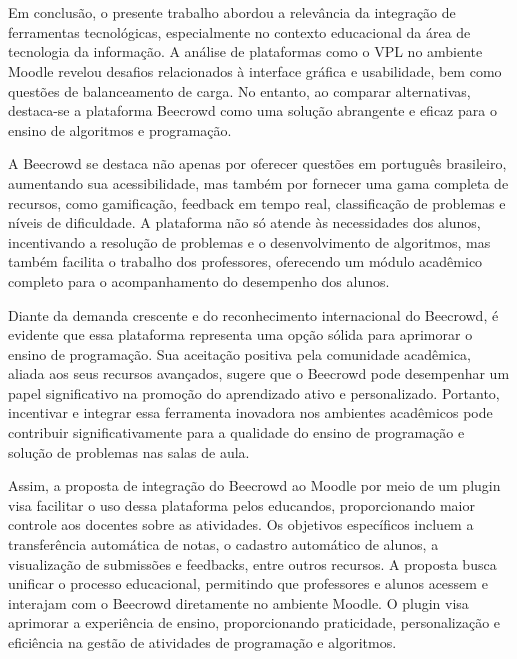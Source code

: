 

\chapter{}

Em conclusão, o presente trabalho abordou a relevância da integração de ferramentas tecnológicas, especialmente no contexto educacional da área de tecnologia da informação. A análise de plataformas como o VPL no ambiente Moodle revelou desafios relacionados à interface gráfica e usabilidade, bem como questões de balanceamento de carga. No entanto, ao comparar alternativas, destaca-se a plataforma Beecrowd como uma solução abrangente e eficaz para o ensino de algoritmos e programação.

A Beecrowd se destaca não apenas por oferecer questões em português brasileiro, aumentando sua acessibilidade, mas também por fornecer uma gama completa de recursos, como gamificação, feedback em tempo real, classificação de problemas e níveis de dificuldade. A plataforma não só atende às necessidades dos alunos, incentivando a resolução de problemas e o desenvolvimento de algoritmos, mas também facilita o trabalho dos professores, oferecendo um módulo acadêmico completo para o acompanhamento do desempenho dos alunos.

Diante da demanda crescente e do reconhecimento internacional do Beecrowd, é evidente que essa plataforma representa uma opção sólida para aprimorar o ensino de programação. Sua aceitação positiva pela comunidade acadêmica, aliada aos seus recursos avançados, sugere que o Beecrowd pode desempenhar um papel significativo na promoção do aprendizado ativo e personalizado. Portanto, incentivar e integrar essa ferramenta inovadora nos ambientes acadêmicos pode contribuir significativamente para a qualidade do ensino de programação e solução de problemas nas salas de aula.

Assim, a proposta de integração do Beecrowd ao Moodle por meio de um plugin visa facilitar o uso dessa plataforma pelos educandos, proporcionando maior controle aos docentes sobre as atividades. Os objetivos específicos incluem a transferência automática de notas, o cadastro automático de alunos, a visualização de submissões e feedbacks, entre outros recursos. A proposta busca unificar o processo educacional, permitindo que professores e alunos acessem e interajam com o Beecrowd diretamente no ambiente Moodle. O plugin visa aprimorar a experiência de ensino, proporcionando praticidade, personalização e eficiência na gestão de atividades de programação e algoritmos.

